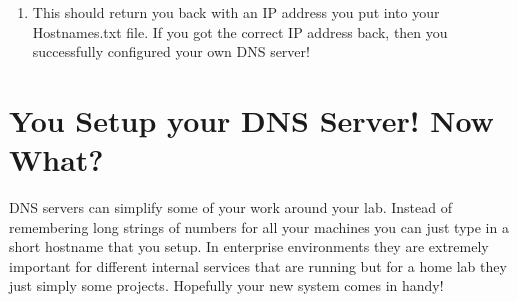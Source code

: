 \documentclass{article} %
\begin{document}
\noindent 

\noindent 

\begin{enumerate}
\item  This should return you back with an IP address you put into your Hostnames.txt file. If you got the correct IP address back, then you successfully configured your own DNS server! 
\end{enumerate}

\noindent 

\noindent 
\section{You Setup your DNS Server! Now What? }

\noindent 

\noindent DNS servers can simplify some of your work around your lab. Instead of remembering long strings of numbers for all your machines you can just type in a short hostname that you setup. In enterprise environments they are extremely important for different internal services that are running but for a home lab they just simply some projects. Hopefully your new system comes in handy! 
\end{document}
